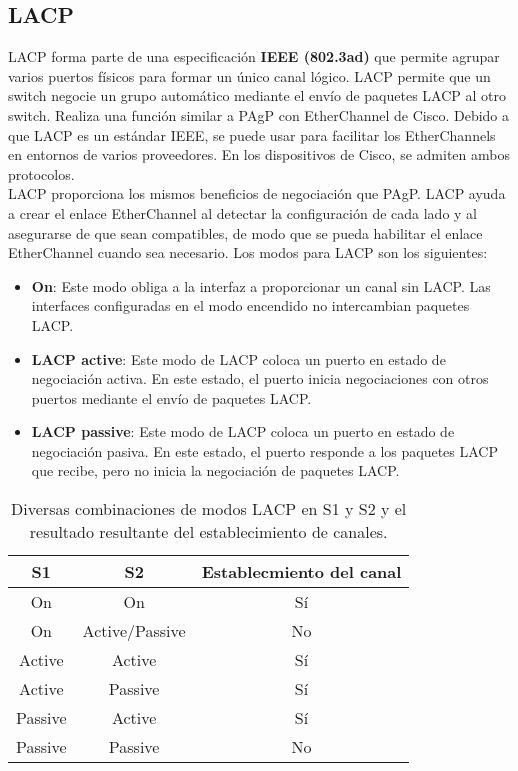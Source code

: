 \documentclass[
	12pt, %
	fleqn, %
	a4paper, %
	oneside, %
]{LegrandOrangeBook}
\begin{document}
\subsection{LACP}
LACP forma parte de una especificación \textbf{IEEE (802.3ad)} que permite agrupar varios puertos físicos  para formar un único canal lógico. LACP permite que un switch negocie un grupo automático mediante  el envío de paquetes LACP al otro switch. Realiza una función similar a PAgP con EtherChannel de  Cisco. Debido a que LACP es un estándar IEEE, se puede usar para facilitar los EtherChannels en entornos de varios proveedores. En los dispositivos de Cisco, se admiten ambos protocolos.\\
LACP proporciona los mismos beneficios de negociación que PAgP. LACP ayuda a crear el enlace  EtherChannel al detectar la configuración de cada lado y al asegurarse de que sean compatibles, de  modo que se pueda habilitar el enlace EtherChannel cuando sea necesario. Los modos para LACP  son los siguientes:
\begin{itemize}
\item \textbf{On}: Este modo obliga a la interfaz a proporcionar un canal sin LACP. Las interfaces
configuradas en el modo encendido no intercambian paquetes LACP.
\item \textbf{LACP active}: Este modo de LACP coloca un puerto en estado de negociación activa. En este
estado, el puerto inicia negociaciones con otros puertos mediante el envío de paquetes LACP.
\item \textbf{LACP passive}: Este modo de LACP coloca un puerto en estado de negociación pasiva. En este  estado, el puerto responde a los paquetes LACP que recibe, pero no inicia la negociación de  paquetes LACP.
\end{itemize}
\begin{table}[H]
\centering
\begin{tabular}{|c|c|c|}
\hline
\rowcolor[HTML]{9698ED} 
S1      & S2             & Establecmiento del canal \\ \hline
On      & On             & Sí                       \\ \hline
On      & Active/Passive & No                       \\ \hline
Active  & Active         & Sí                       \\ \hline
Active  & Passive        & Sí                       \\ \hline
Passive & Active         & Sí                       \\ \hline
Passive & Passive        & No                       \\ \hline
\end{tabular}
\caption{Diversas combinaciones de modos LACP en S1 y S2 y el resultado resultante del establecimiento de canales.}
\end{table}
\end{document}
